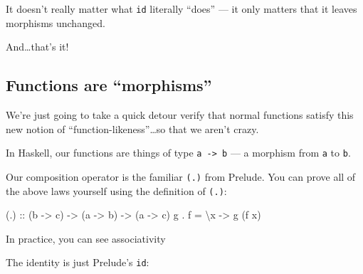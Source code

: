 \documentclass[]{article}
\newenvironment{Shaded}{}{}
\newcommand{\DataTypeTok}[1]{\textcolor[rgb]{0.56,0.13,0.00}{#1}}
\newcommand{\DecValTok}[1]{\textcolor[rgb]{0.25,0.63,0.44}{#1}}
\newcommand{\FunctionTok}[1]{\textcolor[rgb]{0.02,0.16,0.49}{#1}}
\newcommand{\NormalTok}[1]{#1}
\newcommand{\OtherTok}[1]{\textcolor[rgb]{0.00,0.44,0.13}{#1}}
\begin{document}
It doesn't really matter what \texttt{id} literally ``does'' --- it only matters
that it leaves morphisms unchanged.

And\ldots{}that's it!

\hypertarget{functions-are-morphisms}{%
\subsection{Functions are ``morphisms''}\label{functions-are-morphisms}}

We're just going to take a quick detour verify that normal functions satisfy
this new notion of ``function-likeness''\ldots{}so that we aren't crazy.

In Haskell, our functions are things of type \texttt{a\ -\textgreater{}\ b} ---
a morphism from \texttt{a} to \texttt{b}.

Our composition operator is the familiar \texttt{(.)} from Prelude. You can
prove all of the above laws yourself using the definition of \texttt{(.)}:

\begin{Shaded}
\begin{Highlighting}[]
\OtherTok{(.) ::}\NormalTok{ (b }\OtherTok{->}\NormalTok{ c) }\OtherTok{->}\NormalTok{ (a }\OtherTok{->}\NormalTok{ b) }\OtherTok{->}\NormalTok{ (a }\OtherTok{->}\NormalTok{ c)}
\NormalTok{g }\FunctionTok{.}\NormalTok{ f }\FunctionTok{=}\NormalTok{ \textbackslash{}x }\OtherTok{->}\NormalTok{ g (f x)}
\end{Highlighting}
\end{Shaded}

In practice, you can see associativity

\begin{Shaded}
\end{Shaded}

The identity is just Prelude's \texttt{id}:
\end{document}
